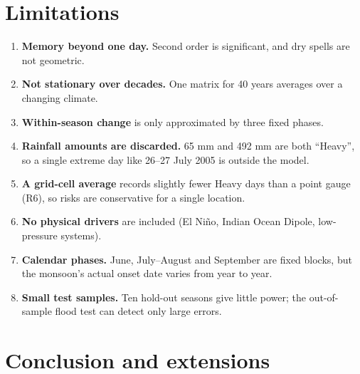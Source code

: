 \documentclass[11pt,a4paper]{article}
\providecommand{\tightlist}{\setlength{\itemsep}{0pt}\setlength{\parskip}{0pt}}
\begin{document}
\section{Limitations}\label{limitations}



\begin{enumerate}

\def\labelenumi{\arabic{enumi}.}

\tightlist

\item

  \textbf{Memory beyond one day.} Second order is significant, and dry spells are not geometric.

\item

  \textbf{Not stationary over decades.} One matrix for 40 years averages over a changing climate.

\item

  \textbf{Within-season change} is only approximated by three fixed phases.

\item

  \textbf{Rainfall amounts are discarded.} 65 mm and 492 mm are both ``Heavy'', so a single extreme day like 26--27 July 2005 is outside the model.

\item

  \textbf{A grid-cell average} records slightly fewer Heavy days than a point gauge (R6), so risks are conservative for a single location.

\item

  \textbf{No physical drivers} are included (El Niño, Indian Ocean Dipole, low-pressure systems).

\item

  \textbf{Calendar phases.} June, July--August and September are fixed blocks, but the monsoon's actual onset date varies from year to year.

\item

  \textbf{Small test samples.} Ten hold-out seasons give little power; the out-of-sample flood test can detect only large errors.

\end{enumerate}



\section{Conclusion and extensions}\label{conclusion-and-extensions}
\end{document}
